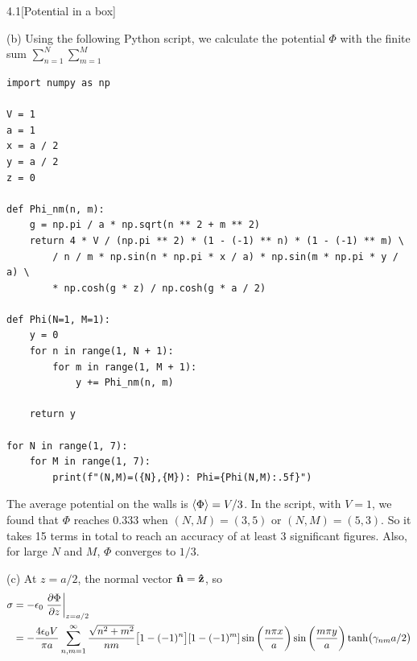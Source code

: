 \documentclass[12pt]{article}
\begin{document}
\begin{problem}{4.1}[Potential in a box]
\begin{solution}
(b) Using the following Python script, we calculate the potential $\Phi$ with
the finite sum $\sum_{n=1}^N\sum_{m=1}^M$
\begin{lstlisting}
import numpy as np

V = 1
a = 1
x = a / 2
y = a / 2
z = 0

def Phi_nm(n, m):
    g = np.pi / a * np.sqrt(n ** 2 + m ** 2)
    return 4 * V / (np.pi ** 2) * (1 - (-1) ** n) * (1 - (-1) ** m) \
        / n / m * np.sin(n * np.pi * x / a) * np.sin(m * np.pi * y / a) \
        * np.cosh(g * z) / np.cosh(g * a / 2)

def Phi(N=1, M=1):
    y = 0
    for n in range(1, N + 1):
        for m in range(1, M + 1):
            y += Phi_nm(n, m)

    return y

for N in range(1, 7):
    for M in range(1, 7):
        print(f"(N,M)=({N},{M}): Phi={Phi(N,M):.5f}")

\end{lstlisting}
The average potential on the walls is $\expval{\Phi}=V / 3$. In the script, with
$V=1$, we found that $\Phi$ reaches $0.333$ when $(N,M)=(3,5)$ or $(N,M)=(5,3)$.
So it takes 15 terms in total to reach an accuracy of at least 3 significant 
figures. Also, for large $N$ and $M$, $\Phi$ converges to $1 /3$.

(c) At $z=a /2$, the normal vector $\vb{\hat{n}}=\vb{\hat{z}}$, so
\begin{align}
    \sigma
    &=-\epsilon_0\eval{\frac{\partial\Phi}{\partial z}}_{z=a /2}\notag\\
    &=-\frac{4\epsilon_0V}{\pi a}\sum_{n,m=1}^\infty
    \frac{\sqrt{n^2+m^2}}{nm}\qty[1-(-1)^n][1-(-1)^m]\sin\qty(\frac{n\pi
    x}{a})\sin\qty(\frac{m\pi y}{a})\tanh(\gamma_{nm}a /2)
\end{align}
\end{solution}
\end{problem}
\end{document}
